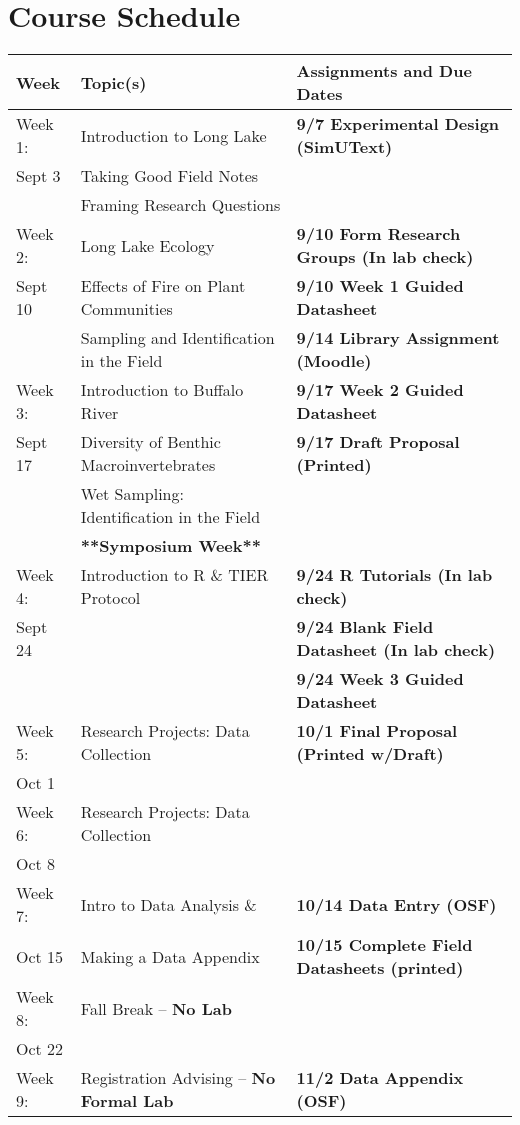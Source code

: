 \documentclass{tufte-handout}
\begin{document}
\section{Course Schedule}

\begin{tabular}{l l l}
Week & Topic(s) & Assignments and Due Dates \\
\hline
Week 1: & Introduction to Long Lake & \textbf{9/7 Experimental Design (SimUText)} \\ 
Sept 3 & Taking Good Field Notes \\
& Framing Research Questions \\
\hline
Week 2: & Long Lake Ecology & \textbf{9/10 Form Research Groups (In lab check)} \\
Sept 10 & Effects of Fire on Plant Communities & \textbf{9/10 Week 1 Guided Datasheet}\\
& Sampling and Identification in the Field & \textbf{9/14 Library Assignment (Moodle)}\\
\hline
Week 3: & Introduction to Buffalo River & \textbf{9/17 Week 2 Guided Datasheet} \\
Sept 17 & Diversity of Benthic Macroinvertebrates & \textbf{9/17 Draft Proposal (Printed)} \\
& Wet Sampling: Identification in the Field \\
 & \textbf{**Symposium Week**} \\
\hline
Week 4: & Introduction to R \& TIER Protocol & \textbf{9/24 R Tutorials (In lab check)} \\
Sept 24 &  & \textbf{9/24 Blank Field Datasheet (In lab check)} \\
 & & \textbf{9/24 Week 3 Guided Datasheet}\\
\hline
Week 5: & Research Projects: Data Collection & \textbf{10/1 Final Proposal (Printed w/Draft)}\\
Oct 1 & & \\
\hline 
Week 6: & Research Projects: Data Collection &  \\
Oct 8 & \\
\hline 
Week 7: & Intro to Data Analysis \& &  \textbf{10/14 Data Entry (OSF)} \\
Oct 15 & Making a Data Appendix & \textbf{10/15 Complete Field Datasheets (printed)}\\
\hline
Week 8: & Fall Break -- \textbf{No Lab} & \\
Oct 22 & \\
\hline 
Week 9: & Registration Advising -- \textbf{No Formal Lab} & \textbf{11/2 Data Appendix (OSF)} \\

\end{tabular}
\end{document}
